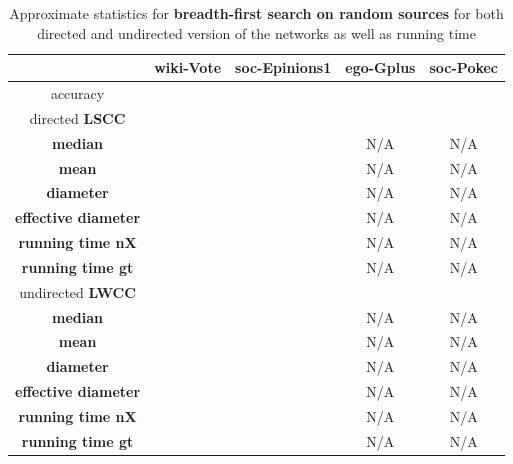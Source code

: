 \documentclass[12pt,a4paper]{article}
\begin{document}
\begin{table}[h!]
\centering
\caption{Approximate statistics for \textbf{breadth-first search on random sources} for both directed and undirected version of the networks as well as running time}
\begin{tabular}{c|c|c|c|c}
	& \textbf{wiki-Vote}	& \textbf{soc-Epinions1}	& \textbf{ego-Gplus}	&	\textbf{soc-Pokec}\\ \hline
accuracy	&  	& 	& 	&	\\ \hline
directed \textbf{LSCC}	& 	& 	& 	&	\\ \hline
\textbf{median} 			&	 			&					&N/A				&N/A	\\
\textbf{mean} 			&	 			&					&N/A				&N/A	\\
\textbf{diameter} 		&	 			&					&N/A				&N/A	\\
\textbf{effective diameter} 	&	 			&					&N/A				&N/A	\\
\textbf{running time nX}	&				&					&N/A				&N/A	\\
\textbf{running time gt}	&				&					&N/A				&N/A	\\ \hline
undirected \textbf{LWCC}	& 	& 	& 	&	\\ \hline
\textbf{median} 			&	 			&					&N/A				&N/A	\\
\textbf{mean} 			&	 			&					&N/A				&N/A	\\
\textbf{diameter} 		&	 			&					&N/A				&N/A	\\
\textbf{effective diameter} 	&	 			&					&N/A				&N/A	\\
\textbf{running time nX} 	&				&					&N/A				&N/A	\\
\textbf{running time gt} 	&				&					&N/A				&N/A
\end{tabular}
\label{tab:approximatestatistics_BFS}
\end{table}
\end{document}
